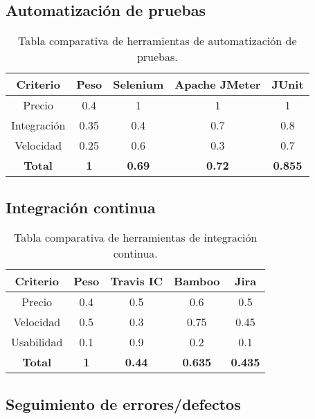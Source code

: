 \subsection{Automatización de pruebas}

\begin{table}[H]
	\begin{center}
		\begin{tabular}{|c||c|c|c|c|}
			\hline
			Criterio & Peso & Selenium & Apache JMeter & JUnit \\
			\hline \hline
			Precio & 0.4 & 1 & 1 & 1 \\ \hline
			Integración & 0.35 & 0.4 & 0.7 & 0.8 \\ \hline
			Velocidad & 0.25 & 0.6 & 0.3 & 0.7 \\ \hline
			\textbf{Total} & \textbf{1} & \textbf{0.69} & \textbf{0.72} & \textbf{0.855} \\ \hline
		\end{tabular}
		\caption{Tabla comparativa de herramientas de automatización de pruebas.}
		\label{tabla:tabla3}
	\end{center}
\end{table}


\subsection{Integración continua}

\begin{table}[H]
	\begin{center}
		\begin{tabular}{|c||c|c|c|c|}
			\hline
			Criterio & Peso & Travis IC & Bamboo & Jira \\
			\hline \hline
			Precio & 0.4 & 0.5 & 0.6 & 0.5 \\ \hline
			Velocidad & 0.5 & 0.3 & 0.75 & 0.45 \\ \hline
			Usabilidad & 0.1 & 0.9 & 0.2 & 0.1 \\ \hline
			\textbf{Total} & \textbf{1} & \textbf{0.44} & \textbf{0.635} & \textbf{0.435} \\ \hline
		\end{tabular}
		\caption{Tabla comparativa de herramientas de integración continua.}
		\label{tabla:tabla4}
	\end{center}
\end{table}


\subsection{Seguimiento de errores/defectos}

